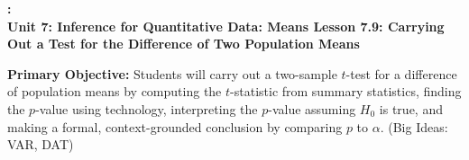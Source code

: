 \documentclass[10pt]{article}
\newcommand{\UnitNumberName}{Unit 7: Inference for Quantitative Data: Means \quad}
\newcommand{\LessonNumberName}{Lesson 7.9: Carrying Out a Test for the Difference of Two Population Means}
\begin{document}
\begin{center}
    {\Large\bfseries \CourseName: \SchoolYear \\
    {\small\bfseries \UnitNumberName \LessonNumberName}}
\end{center}

\begin{tcolorbox}[colback=sky, colframe=navy, boxrule=0.9pt, arc=2mm,
    left=2mm, right=2mm, top=1.5mm, bottom=1.5mm]
    \textbf{Primary Objective:} Students will carry out a two-sample $t$-test for a difference
    of population means by computing the $t$-statistic from summary statistics, finding the
    $p$-value using technology, interpreting the $p$-value assuming $H_0$ is true, and making
    a formal, context-grounded conclusion by comparing $p$ to $\alpha$.
    (Big Ideas: VAR, DAT)
\end{tcolorbox}
\end{document}

